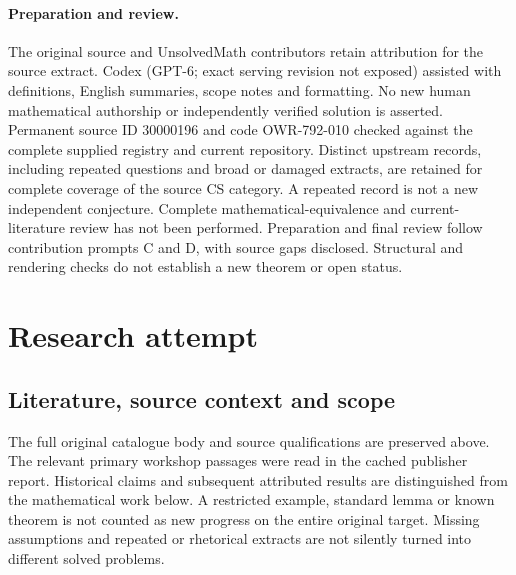 \documentclass[11pt]{article}
\begin{document}
\paragraph{Preparation and review.}
The original source and UnsolvedMath contributors retain attribution for the source extract. Codex (GPT-6; exact serving revision not exposed) assisted with definitions, English summaries, scope notes and formatting. No new human mathematical authorship or independently verified solution is asserted. Permanent source ID 30000196 and code OWR-792-010 checked against the complete supplied registry and current repository. Distinct upstream records, including repeated questions and broad or damaged extracts, are retained for complete coverage of the source CS category. A repeated record is not a new independent conjecture. Complete mathematical-equivalence and current-literature review has not been performed. Preparation and final review follow contribution prompts C and D, with source gaps disclosed. Structural and rendering checks do not establish a new theorem or open status.
\label{end:30000196}

\section{Research attempt}
\subsection{Literature, source context and scope}
The full original catalogue body and source qualifications are preserved above. The relevant primary workshop passages were read in the cached publisher report. Historical claims and subsequent attributed results are distinguished from the mathematical work below. A restricted example, standard lemma or known theorem is not counted as new progress on the entire original target. Missing assumptions and repeated or rhetorical extracts are not silently turned into different solved problems.
\end{document}
